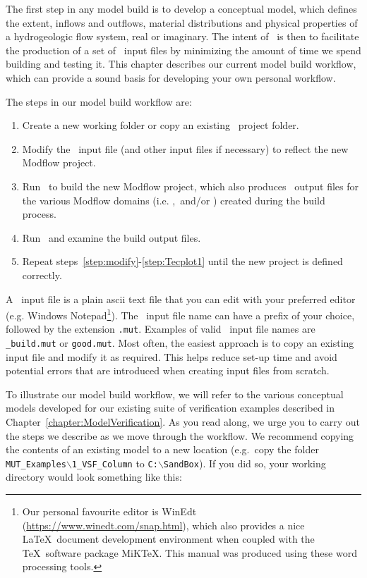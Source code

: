 \label{chapter:ModelBuild}
The first step in any model build is to develop a conceptual model, which defines the extent, inflows and outflows, material distributions and physical properties of a hydrogeologic flow system, real or imaginary. The intent of \mut\ is then to facilitate the production of a set of \mfus\ input files by minimizing the amount of time we spend building and testing it.  This chapter describes our current model build workflow, which can provide a sound basis for developing your own personal workflow.

The steps in our model build workflow are:
\begin{enumerate}
    \item Create a new working folder or copy an existing \mut\ project folder. \label{step:copy}
    \item Modify the \mut\ input file (and other input files if necessary) to reflect the new Modflow project.\label{step:modify}
    \item Run \mut\ to build the new Modflow project, which also produces \tecplot\ output files for the various Modflow domains (i.e. \gwf,\swf\ and/or \cln ) created during the build process. \label{step:mut1}
    \item Run \tecplot\ and examine the build output files.   \label{step:Tecplot1}
    \item Repeat steps~\ref{step:modify}-\ref{step:Tecplot1} until the new project is defined correctly.
\end{enumerate}

A \mut\ input file is a plain ascii text file that you can edit with your preferred editor (e.g. Windows Notepad\footnote{Our personal favourite editor is WinEdt (\url{https://www.winedt.com/snap.html}), which also provides a nice \LaTeX\ document development environment when coupled with the \TeX\ software package MiKTeX.  This manual was produced using these word processing tools.}).
The \mut\ input file name can have a prefix of your choice, followed by the extension \texttt{.mut}. Examples of valid \mut\ input file names are \texttt{\_build.mut} or \texttt{good.mut}. Most often, the easiest approach is to copy an existing input file and modify it as required.  This helps reduce set-up time and avoid potential errors that are introduced when creating input files from scratch.

To illustrate our model build workflow, we will refer to the various conceptual models developed for our existing suite of verification examples described in  Chapter~\ref{chapter:ModelVerification}.  As you read along, we urge you to carry out the steps we describe as we move through the workflow.  We recommend copying the contents of an existing model to a new location (e.g.\ copy the folder \texttt{MUT\_Examples$\backslash$1\_VSF\_Column} to \texttt{C:$\backslash$SandBox}).  If you did so, your working directory would look something like this:

